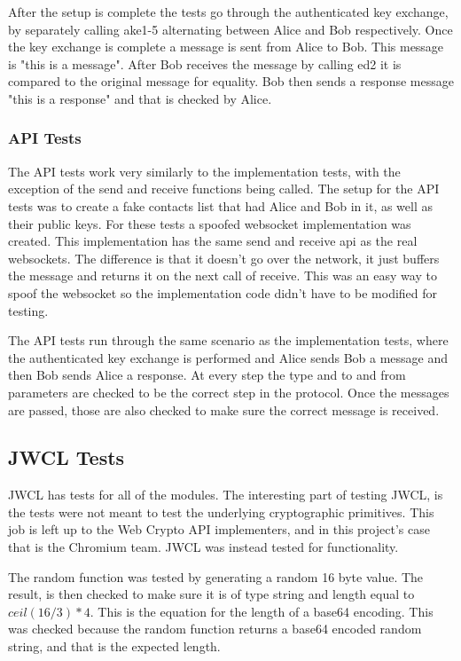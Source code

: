 After the setup is complete the tests go through the authenticated key exchange, by separately calling ake1-5 alternating between Alice and Bob respectively. Once the key exchange is complete a message is sent from Alice to Bob. This message is "this is a message". After Bob receives the message by calling ed2 it is compared to the original message for equality. Bob then sends a response message "this is a response" and that is checked by Alice.


\subsubsection{API Tests} 


The API tests work very similarly to the implementation tests, with the exception of the send and receive functions being called. The setup for the API tests was to create a fake contacts list that had Alice and Bob in it, as well as their public keys. For these tests a spoofed websocket implementation was created. This implementation has the same send and receive api as the real websockets. The difference is that it doesn't go over the network, it just buffers the message and returns it on the next call of receive. This was an easy way to spoof the websocket so the implementation code didn't have to be modified for testing.


The API tests run through the same scenario as the implementation tests, where the authenticated key exchange is performed and Alice sends Bob a message and then Bob sends Alice a response. At every step the type and to and from parameters are checked to be the correct step in the protocol. Once the messages are passed, those are also checked to make sure the correct message is received.


\subsection{JWCL Tests}


JWCL has tests for all of the modules. The interesting part of testing JWCL, is the tests were not meant to test the underlying cryptographic primitives. This job is left up to the Web Crypto API implementers, and in this project's case that is the Chromium team. JWCL was instead tested for functionality.


The random function was tested by generating a random 16 byte value. The result, is then checked to make sure it is of type string and length equal to $ceil(16/3)*4$. This is the equation for the length of a base64 encoding. This was checked because the random function returns a base64 encoded random string, and that is the expected length.


